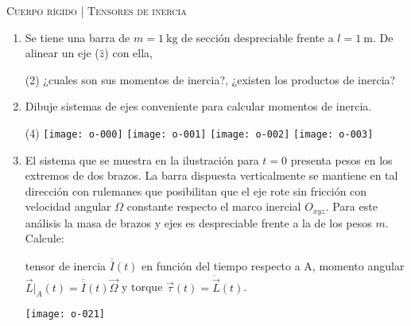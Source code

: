 \documentclass[11pt, spanish, a4paper, twoside]{article}
\begin{document}
\begin{center}
  \textsc{\large Cuerpo rígido | Tensores de inercia}
\end{center}


\begin{enumerate}



\item Se tiene una barra de \(m= \SI{1}{\kilo\gram}\) de sección despreciable frente a \(l= \SI{1}{\metre}\).
De alinear un eje (\(\hat{z}\)) con ella, 
\begin{tasks}(2)
	\task	¿cuales son sus momentos de inercia?,
	\task ¿existen los productos de inercia? 
\end{tasks}


\item
Dibuje sistemas de ejes conveniente para calcular momentos de inercia.
\vspace{-1.1cm}
\begin{tasks}(4)
	\task \texttt{[image: o-000]}
	\task \texttt{[image: o-001]}
	\task \texttt{[image: o-002]}
	\task \texttt{[image: o-003]}
\end{tasks}



\item 
\begin{minipage}[t][4.5cm]{0.7\textwidth}
El sistema que se muestra en la ilustración para \(t=0\) presenta pesos en los extremos de dos brazos.
La barra dispuesta verticalmente se mantiene en tal dirección con rulemanes que posibilitan que el eje rote sin fricción con velocidad angular $\Omega$ constante respecto el marco inercial $O_{xyz}$.
Para este análisis la masa de brazos y ejes es despreciable frente a la de los pesos \(m\).
Calcule: 
\begin{tasks} 
	\task tensor de inercia \(\overline{\overline{I}}(t)\) en función del tiempo respecto a A,
	\task momento angular $\vec{L}\bigg\rvert_A (t) = \overline{\overline{I}} (t) \vec{\Omega}$ y torque $\vec{\tau} (t) = \dot{\vec{L}} (t)$.
\end{tasks}
\end{minipage}
\begin{minipage}[c][0cm][t]{0.25\textwidth}
	\texttt{[image: o-021]}
\end{minipage}




\end{enumerate}
\end{document}

